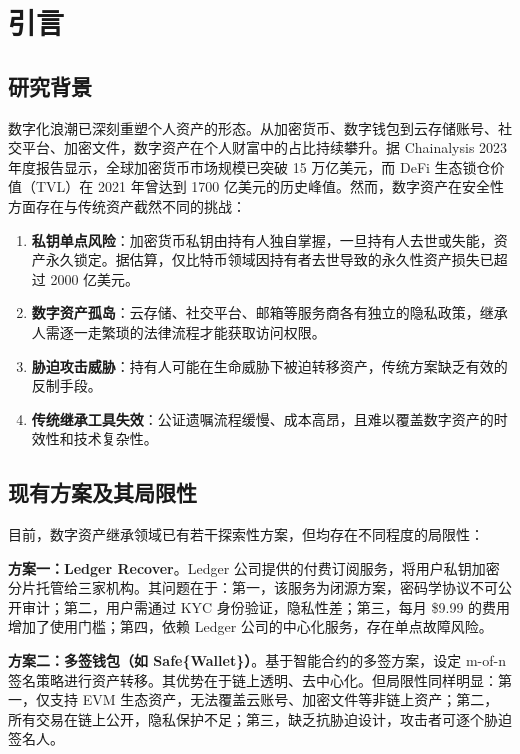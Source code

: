 \section{引言}

\subsection{研究背景}

数字化浪潮已深刻重塑个人资产的形态。从加密货币、数字钱包到云存储账号、社交平台、加密文件，数字资产在个人财富中的占比持续攀升。据 Chainalysis 2023 年度报告显示，全球加密货币市场规模已突破 15 万亿美元，而 DeFi 生态锁仓价值（TVL）在 2021 年曾达到 1700 亿美元的历史峰值。然而，数字资产在安全性方面存在与传统资产截然不同的挑战：

\begin{enumerate}[label=(\arabic*)]
    \item \textbf{私钥单点风险}：加密货币私钥由持有人独自掌握，一旦持有人去世或失能，资产永久锁定。据估算，仅比特币领域因持有者去世导致的永久性资产损失已超过 2000 亿美元。
    \item \textbf{数字资产孤岛}：云存储、社交平台、邮箱等服务商各有独立的隐私政策，继承人需逐一走繁琐的法律流程才能获取访问权限。
    \item \textbf{胁迫攻击威胁}：持有人可能在生命威胁下被迫转移资产，传统方案缺乏有效的反制手段。
    \item \textbf{传统继承工具失效}：公证遗嘱流程缓慢、成本高昂，且难以覆盖数字资产的时效性和技术复杂性。
\end{enumerate}

\subsection{现有方案及其局限性}

目前，数字资产继承领域已有若干探索性方案，但均存在不同程度的局限性：

\textbf{方案一：Ledger Recover}。Ledger 公司提供的付费订阅服务，将用户私钥加密分片托管给三家机构。其问题在于：第一，该服务为闭源方案，密码学协议不可公开审计；第二，用户需通过 KYC 身份验证，隐私性差；第三，每月 \$9.99 的费用增加了使用门槛；第四，依赖 Ledger 公司的中心化服务，存在单点故障风险。

\textbf{方案二：多签钱包（如 Safe\{Wallet\}）}。基于智能合约的多签方案，设定 m-of-n 签名策略进行资产转移。其优势在于链上透明、去中心化。但局限性同样明显：第一，仅支持 EVM 生态资产，无法覆盖云账号、加密文件等非链上资产；第二，所有交易在链上公开，隐私保护不足；第三，缺乏抗胁迫设计，攻击者可逐个胁迫签名人。

